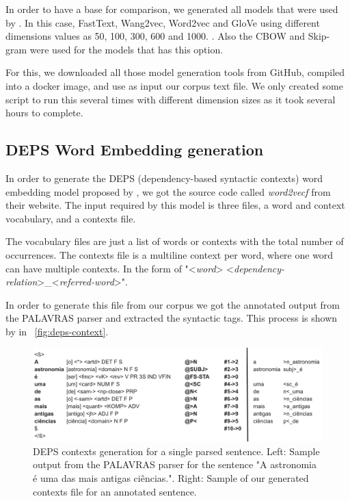 In order to have a base for comparison, we generated all models that were used by . In this case, FastText, Wang2vec, Word2vec and GloVe using different dimensions values as 50, 100, 300, 600 and 1000. \cite{bojanowski2016enriching, Ling:2015:naacl, Mikolov2013DistributedRO, Pennington2014}. Also the CBOW and Skip-gram were used for the models that has this option.

For this, we downloaded all those model generation tools from GitHub, compiled into a docker image, and use as input our corpus text file. We only created some script to run this several times with different dimension sizes as it took several hours to complete.


\subsection{DEPS Word Embedding generation}\label{chap:methodsandmaterials:depsgeneration}

In order to generate the DEPS (dependency-based syntactic contexts) word embedding model proposed by , we got the source code called \textit{word2vecf} from their website. The input required by this model is three files, a word and context vocabulary, and a contexts file. 

The vocabulary files are just a list of words or contexts with the total number of occurrences. The contexts file is a multiline context per word, where one word can have multiple contexts. In the form of "<\textit{word}> <\textit{dependency-relation}>\_<\textit{referred-word}>".

In order to generate this file from our corpus we got the annotated output from the PALAVRAS parser and extracted the syntactic tags. This process is shown by in ~\autoref{fig:deps-context}.

\begin{figure}[h]
	\caption{DEPS contexts generation for a single parsed sentence. Left: Sample output from the PALAVRAS parser for the sentence "A astronomia é uma das mais antigas ciências.". Right: Sample of our generated contexts file for an annotated sentence.}
	\label{fig:deps-context}
	\centering%
	\begin{minipage}{.95\textwidth}
		\includegraphics[width=\textwidth]{deps-context.png}
	\end{minipage}
\end{figure}

